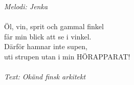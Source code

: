 {\footnotesize\textit{Melodi: Jenka}}\\
\\
Öl, vin, sprit och gammal finkel\\
får min blick att se i vinkel.\\
Därför hamnar inte supen,\\
uti strupen utan i min HÖRAPPARAT!\\
\\
{\footnotesize\textit{Text: Okänd finsk arkitekt}}
